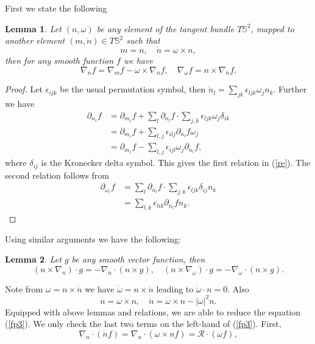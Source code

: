 \documentclass[reqno]{amsart}
\numberwithin{equation}{section}
\newtheorem{Lemma}{Lemma}[section]
\theoremstyle{definition}
\theoremstyle{remark}
\begin{document}
First we state the following
\begin{Lemma}\label{lem3.2} Let $(n, \omega)$ be any element of the tangent bundle $T\mathbb{S}^2$, mapped to another element
$(m, \dot n)\in T\mathbb{S}^2$ such that
$$
m=n, \quad \dot n= \omega \times n,
$$
then for any smooth function $f$  we have
\begin{equation}\label{re}
\nabla_n f= \nabla_m f -\omega \times \nabla_{\dot n} f, \quad
\nabla_\omega f= n\times \nabla_{\dot n} f.
\end{equation}

\end{Lemma}
\begin{proof}Let $\epsilon_{ijk}$ be the usual permutation symbol,
then $\dot n_l= \sum_{jk}\epsilon_{ljk} \omega_jn_k$. Further we
have
\begin{align*}
\partial_{n_i}f &= \partial_{m_i}f +\sum_l \partial_{\dot n_l}f
\cdot \sum_{j, k}\epsilon_{ljk}\omega_j \delta_{ik}\\
&=\partial_{ m_i}f +\sum_{l,j}\epsilon_{ilj} \partial_{\dot n_l}f
\omega_j \\
&=\partial_{ m_i}f - \sum_{l, j}\epsilon_{ijl} \omega_j
\partial_{\dot n_l}f,
\end{align*}
where $\delta_{ij}$ is the Kronecker delta symbol. This gives the
first relation in (\ref{re}). The second relation follows from
\begin{align*}
\partial_{\omega_i}f &=\sum_l \partial_{\dot n_l}f
\cdot \sum_{j, k}\epsilon_{ljk}\delta_{ij} n_{k}\\
&=\sum_{l, k}\epsilon_{lik} \partial_{\dot n_l}f n_k.
\end{align*}
\end{proof}
Using similar arguments we have the following:
\begin{Lemma}\label{lem3.3} Let $g$ be any smooth vector function, then
\begin{equation}\label{re2}
    (n \times \nabla_n )\cdot g=-\nabla_n \cdot(n\times g), \quad
     (n \times \nabla_\omega )\cdot g=-\nabla_\omega \cdot(n\times
     g).
\end{equation}
\end{Lemma}
Note from $\omega=n\times \dot n$ we have $\dot \omega=n\times \ddot
n$ leading to $\dot \omega \cdot n=0$. Also
$$
\dot n=\omega \times n, \quad \ddot n=\dot \omega \times n
-|\omega|^2 n.
$$
Equipped with above lemmas and relations, we are able to reduce the
equation (\ref{fp3}). We only check the last two terms on the
left-hand of (\ref{fp3}). First,
$$
\nabla_n\cdot(\dot n f)=\nabla_n\cdot(\omega \times n f)=\mathcal{R}\cdot(\omega
f),
$$
\end{document}
